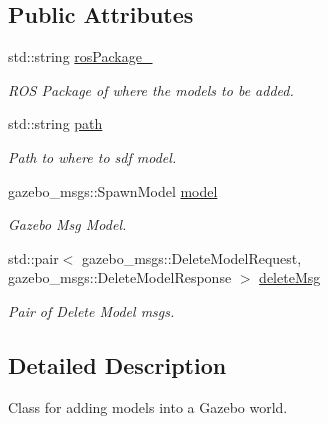 \subsection*{Public Attributes}
\begin{DoxyCompactItemize}
\item 
std\+::string \hyperlink{classmodelHandlingRos_a6e67e7a319582e5a1c4cd7692b51f3ce}{ros\+Package\+\_\+}\hypertarget{classmodelHandlingRos_a6e67e7a319582e5a1c4cd7692b51f3ce}{}\label{classmodelHandlingRos_a6e67e7a319582e5a1c4cd7692b51f3ce}

\begin{DoxyCompactList}\small\item\em R\+OS Package of where the models to be added. \end{DoxyCompactList}\item 
std\+::string \hyperlink{classmodelHandlingRos_a50d257e7e2686168994f8e1c2186288e}{path}\hypertarget{classmodelHandlingRos_a50d257e7e2686168994f8e1c2186288e}{}\label{classmodelHandlingRos_a50d257e7e2686168994f8e1c2186288e}

\begin{DoxyCompactList}\small\item\em Path to where to sdf model. \end{DoxyCompactList}\item 
gazebo\+\_\+msgs\+::\+Spawn\+Model \hyperlink{classmodelHandlingRos_a569eb064c364681c2b3e19d5830e792b}{model}\hypertarget{classmodelHandlingRos_a569eb064c364681c2b3e19d5830e792b}{}\label{classmodelHandlingRos_a569eb064c364681c2b3e19d5830e792b}

\begin{DoxyCompactList}\small\item\em Gazebo Msg Model. \end{DoxyCompactList}\item 
std\+::pair$<$ gazebo\+\_\+msgs\+::\+Delete\+Model\+Request, gazebo\+\_\+msgs\+::\+Delete\+Model\+Response $>$ \hyperlink{classmodelHandlingRos_a6891536ab9f61f19a3115a99b6a1062d}{delete\+Msg}\hypertarget{classmodelHandlingRos_a6891536ab9f61f19a3115a99b6a1062d}{}\label{classmodelHandlingRos_a6891536ab9f61f19a3115a99b6a1062d}

\begin{DoxyCompactList}\small\item\em Pair of Delete Model msgs. \end{DoxyCompactList}\end{DoxyCompactItemize}


\subsection{Detailed Description}
Class for adding models into a Gazebo world. 

